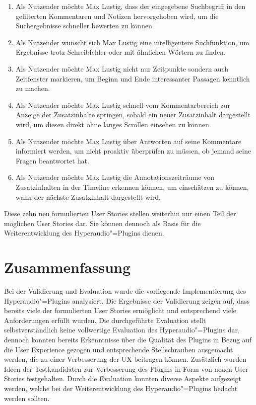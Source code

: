 \begin{enumerate}[leftmargin=1.3cm,label=US-\arabic*:,ref=US-\arabic*]
\item Als Nutzender möchte Max Lustig, dass der eingegebene Suchbegriff in den gefilterten Kommentaren und Notizen hervorgehoben wird, um die Suchergebnisse schneller bewerten zu können.
\item Als Nutzender wünscht sich Max Lustig eine intelligentere Suchfunktion, um Ergebnisse trotz Schreibfehler oder mit ähnlichen Wörtern zu finden.
\item Als Nutzender möchte Max Lustig nicht nur Zeitpunkte sondern auch Zeitfenster markieren, um Beginn und Ende interessanter Passagen kenntlich zu machen.
\item Als Nutzender möchte Max Lustig schnell vom Kommentarbereich zur Anzeige der Zusatzinhalte springen, sobald ein neuer Zusatzinhalt dargestellt wird, um diesen direkt ohne langes Scrollen einsehen zu können.
\item Als Nutzender möchte Max Lustig über Antworten auf seine Kommentare informiert werden, um nicht proaktiv überprüfen zu müssen, ob jemand seine Fragen beantwortet hat.
\item Als Nutzender möchte Max Lustig die Annotationszeiträume von Zusatzinhalten in der Timeline erkennen können, um einschätzen zu können, wann der nächste Zusatzinhalt dargestellt wird.
\end{enumerate}


Diese zehn neu formulierten User Stories stellen weiterhin nur einen Teil der möglichen User Stories dar. Sie können dennoch als Basis für die Weiterentwicklung des Hyperaudio"=Plugins dienen.

\section{Zusammenfassung}
Bei der Validierung und Evaluation wurde die vorliegende Implementierung des Hyperaudio"=Plugins analysiert. Die Ergebnisse der Validierung zeigen auf, dass bereits viele der formulierten User Stories ermöglicht und entsprechend viele Anforderungen erfüllt wurden. Die durchgeführte Evaluation stellt selbstverständlich keine vollwertige Evaluation des Hyperaudio"=Plugins dar, dennoch konnten bereits Erkenntnisse über die Qualität des Plugins in Bezug auf die User Experience gezogen und entsprechende Stellschrauben ausgemacht werden, die zu einer Verbesserung der UX beitragen können. Zusätzlich wurden Ideen der Testkandidaten zur Verbesserung des Plugins in Form von neuen User Stories festgehalten. Durch die Evaluation konnten diverse Aspekte aufgezeigt werden, welche bei der Weiterentwicklung des Hyperaudio"=Plugins bedacht werden sollten.


